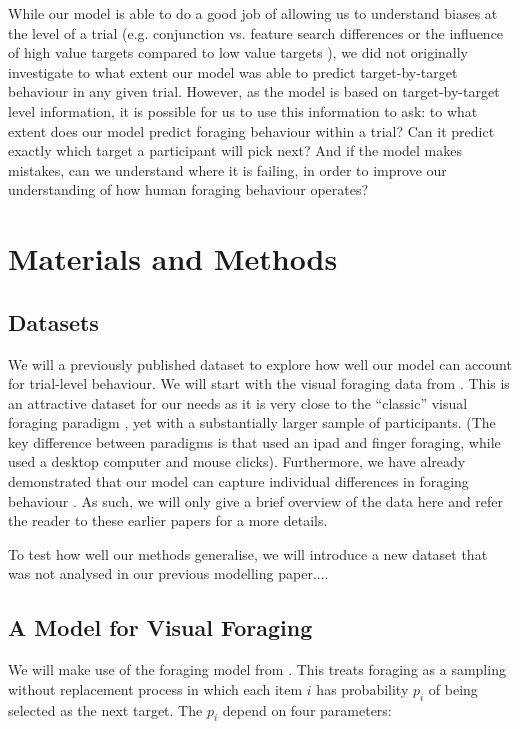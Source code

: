 \documentclass[vision,article,submit,pdftex,moreauthors]{Definitions/mdpi}
\begin{document}
While our model is able to do a good job of allowing us to understand biases at the level of a trial (e.g. conjunction vs. feature search differences \cite{kristjansson2014} or the influence of high value targets compared to low value targets \cite{tagu2020}), we did not originally investigate to what extent our model was able to predict target-by-target behaviour in any given trial. However, as the model is based on target-by-target level information, it is possible for us to use this information to ask: to what extent does our model predict foraging behaviour within a trial? Can it predict exactly which target a participant will pick next? And if the model makes mistakes, can we understand where it is failing, in order to improve our understanding of how human foraging behaviour operates?

\section{Materials and Methods}

\subsection{Datasets}

We will a previously published dataset to explore how well our model can account for trial-level behaviour. We will start with the visual foraging data from \cite{clarke2022}. This is an attractive dataset for our needs as it is very close to the ``classic'' visual foraging paradigm \citep{kristjansson2014}, yet with a substantially larger sample of participants. (The key difference between paradigms is that \cite{kristjansson2014} used an ipad and finger foraging, while \cite{clarke2022} used a desktop computer and mouse clicks). Furthermore, we have already demonstrated that our model can capture individual differences in foraging behaviour \citep{clarke2022}. As such, we will only give a brief overview of the data here and refer the reader to these earlier papers for a more details.

To test how well our methods generalise, we will introduce a new dataset that was not analysed in our previous modelling paper....


\subsection{A Model for Visual Foraging}

We will make use of the foraging model from \cite{clarke2022}. This treats foraging as a sampling without replacement process in which each item $i$ has probability $p_i$ of being selected as the next target. The $p_i$ depend on four parameters:
\end{document}
